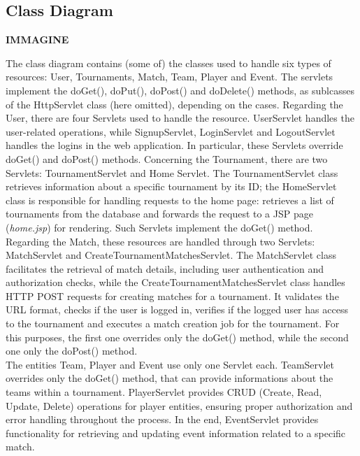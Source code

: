 \subsection{Class Diagram}

\textbf{IMMAGINE}

The class diagram contains (some of) the classes used to handle six types of resources: User, Tournaments, Match, Team, Player and Event. The servlets implement the doGet(), doPut(), doPost() and doDelete() methods, as sublcasses of the HttpServlet class (here omitted), depending on the cases.
Regarding the User, there are four Servlets used to handle the resource.
UserServlet handles the user-related operations, while SignupServlet, LoginServlet and LogoutServlet handles the logins in
the web application. In particular, these Servlets override doGet() and doPost() methods.
Concerning the Tournament, there are two Servlets: TournamentServlet and Home Servlet. The TournamentServlet class retrieves information about a specific tournament by its ID; the HomeServlet class is responsible for handling requests to the home page: retrieves a list of tournaments from the database and forwards the request to a JSP page (\textit{home.jsp}) for rendering.
Such Servlets implement the doGet() method.
Regarding the Match, these resources are handled through two Servlets: MatchServlet and CreateTournamentMatchesServlet. The MatchServlet class facilitates the retrieval of match details, including user authentication and authorization checks, while the CreateTournamentMatchesServlet class handles HTTP POST requests for creating matches for a tournament. It validates the URL format, checks if the user is logged in, verifies if the logged user has access to the tournament and executes a match creation job for the tournament. For this purposes, the first one overrides only the doGet() method, while the second one only the doPost() method.\\
The entities Team, Player and Event use only one Servlet each. TeamServlet overrides only the doGet() method, that can provide informations about the teams within a tournament.
PlayerServlet provides CRUD (Create, Read, Update, Delete) operations for player entities, ensuring proper authorization and error handling throughout the process.
In the end, EventServlet provides functionality for retrieving and updating event information related to a specific match.